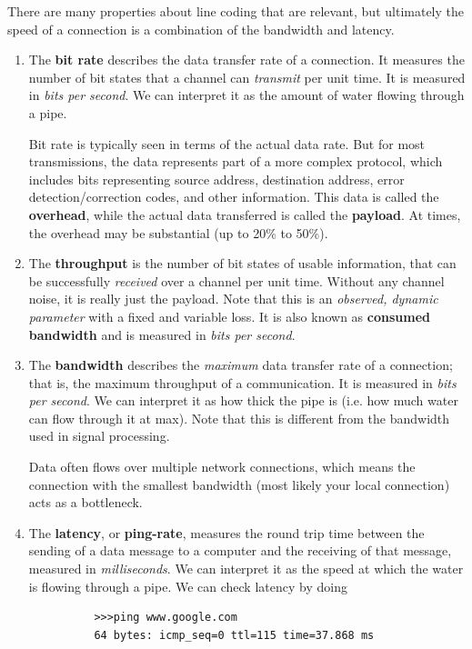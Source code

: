 \documentclass{article}
\begin{document}
    \begin{definition}
      There are many properties about line coding that are relevant, but ultimately the speed of a connection is a combination of the bandwidth and latency. 

      \begin{enumerate}
        \item The \textbf{bit rate} describes the data transfer rate of a connection. It measures the number of bit states that a channel can \textit{transmit} per unit time. It is measured in \textit{bits per second}. We can interpret it as the amount of water flowing through a pipe. 
        
        Bit rate is typically seen in terms of the actual data rate. But for most transmissions, the data represents part of a more complex protocol, which includes bits representing source address, destination address, error detection/correction codes, and other information. This data is called the \textbf{overhead}, while the actual data transferred is called the \textbf{payload}. At times, the overhead may be substantial (up to 20\% to 50\%). 

        \item The \textbf{throughput} is the number of bit states of usable information, that can be successfully \textit{received} over a channel per unit time. Without any channel noise, it is really just the payload. Note that this is an \textit{observed, dynamic parameter} with a fixed and variable loss. It is also known as \textbf{consumed bandwidth} and is measured in \textit{bits per second}. 
        
        \item The \textbf{bandwidth} describes the \textit{maximum} data transfer rate of a connection; that is, the maximum throughput of a communication. It is measured in \textit{bits per second}. We can interpret it as how thick the pipe is (i.e. how much water can flow through it at max). Note that this is different from the bandwidth used in signal processing. 
        
        Data often flows over multiple network connections, which means the connection with the smallest bandwidth (most likely your local connection) acts as a bottleneck. 
        
        \item The \textbf{latency}, or \textbf{ping-rate}, measures the round trip time between the sending of a data message to a computer and the receiving of that message, measured in \textit{milliseconds}. We can interpret it as the speed at which the water is flowing through a pipe. We can check latency by doing
        \begin{lstlisting}
          >>>ping www.google.com
          64 bytes: icmp_seq=0 ttl=115 time=37.868 ms
        \end{lstlisting}


\end{enumerate}
\end{definition}
\end{document}
